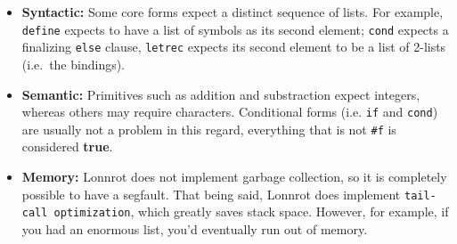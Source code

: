 \begin{itemize}
  \item \textbf{Syntactic:} Some core forms expect a distinct sequence of lists. For example,
        \texttt{define} expects to have a list of symbols as its second element;
        \texttt{cond} expects a finalizing \texttt{else} clause, \texttt{letrec} expects its
        second element to be a list of 2-lists (i.e.\ the bindings).
  \item \textbf{Semantic:} Primitives such as addition and substraction expect integers, whereas
        others may require characters. Conditional forms (i.e. \texttt{if} and \texttt{cond}) are
        usually not a problem in this regard, everything that is not \texttt{\#f} is considered
        \textbf{true}.
  \item \textbf{Memory:} Lonnrot does not implement garbage collection, so it is completely possible
        to have a segfault. That being said, Lonnrot does implement \texttt{tail-call optimization},
        which greatly saves stack space. However, for example, if you had an enormous list, you'd eventually
        run out of memory.
\end{itemize}

